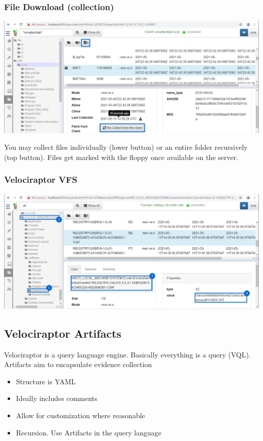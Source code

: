 \subsubsection*{File Download (collection)}
\includegraphics[width=\textwidth]{resources/06-velociraptor-interface-04.png}

You may collect files individually (lower button) or an entire folder recursively (top button). Files get marked with the floppy once available on the server.

\subsubsection*{Velociraptor VFS}
\includegraphics[width=\textwidth]{resources/06-velociraptor-interface-05.png}

\subsection{Velociraptor Artifacts}

Velociraptor is a query language engine. Basically everything is a query (VQL).
Artifacts aim to encapsulate evidence collection

\begin{itemize}
  \item Structure is YAML
  \item Ideally includes comments
  \item Allow for customization where reasonable
  \item Recursion. Use Artifacts in the query language
\end{itemize}

